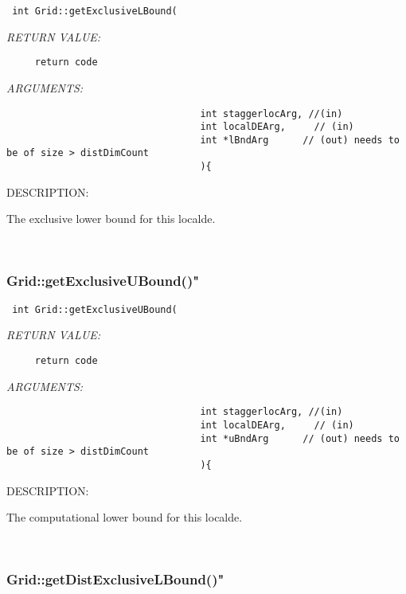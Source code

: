   
\begin{verbatim} int Grid::getExclusiveLBound(\end{verbatim}{\em RETURN VALUE:}
\begin{verbatim}     return code\end{verbatim}{\em ARGUMENTS:}
\begin{verbatim}                                  int staggerlocArg, //(in)
                                  int localDEArg,     // (in)
                                  int *lBndArg      // (out) needs to be of size > distDimCount
                                  ){\end{verbatim}
{\sf DESCRIPTION:\\ }


    The exclusive lower bound for this localde.
   
 
\mbox{}\hrulefill\
 
\subsubsection [Grid::getExclusiveUBound()"] {Grid::getExclusiveUBound()"}


  
\begin{verbatim} int Grid::getExclusiveUBound(\end{verbatim}{\em RETURN VALUE:}
\begin{verbatim}     return code\end{verbatim}{\em ARGUMENTS:}
\begin{verbatim}                                  int staggerlocArg, //(in)
                                  int localDEArg,     // (in)
                                  int *uBndArg      // (out) needs to be of size > distDimCount
                                  ){\end{verbatim}
{\sf DESCRIPTION:\\ }


    The computational lower bound for this localde.
   
 
\mbox{}\hrulefill\
 
\subsubsection [Grid::getDistExclusiveLBound()"] {Grid::getDistExclusiveLBound()"}


